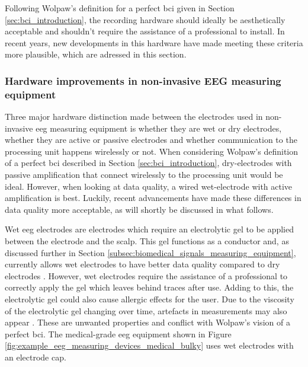 Following Wolpaw's definition for a perfect \gls{bci} given in Section \ref{sec:bci_introduction}, the recording hardware should ideally be aesthetically acceptable and shouldn't require the assistance of a professional to install.
In recent years, new developments in this hardware have made meeting these criteria more plausible, which are adressed in this section.


\subsubsection{Hardware improvements in non-invasive EEG measuring equipment}
\label{subsubsec:bci_gaining_popularity_better_measuring_hardware}

Three major hardware distinction made between the electrodes used in non-invasive \gls{eeg} measuring equipment is whether they are wet or dry electrodes, whether they are active or passive electrodes and whether communication to the processing unit happens wirelessly or not.
When considering Wolpaw's definition of a perfect \gls{bci} described in Section \ref{sec:bci_introduction}, dry-electrodes with passive amplification that connect wirelessly to the processing unit would be ideal.
However, when looking at data quality, a wired wet-electrode with active amplification is best.
Luckily, recent advancements have made these differences in data quality more acceptable, as will shortly be discussed in what follows.

Wet \gls{eeg} electrodes are electrodes which require an electrolytic gel to be applied between the electrode and the scalp.
This gel functions as a conductor and, as discussed further in Section \ref{subsec:biomedical_signals_measuring_equipment}, currently allows wet electrodes to have better data quality compared to dry electrodes \citep{wet_vs_dry, dry_electrode_status, wet_dry_comparison_experiment}.
However, wet electrodes require the assistance of a professional to correctly apply the gel which leaves behind traces after use.
Adding to this, the electrolytic gel could also cause allergic effects for the user. Due to the viscosity of the electrolytic gel changing over time, artefacts in measurements may also appear \citep{dry_electrode_status}.
These are unwanted properties and conflict with Wolpaw's vision of a perfect \gls{bci}.
The medical-grade \gls{eeg} equipment shown in Figure \ref{fig:example_eeg_measuring_devices_medical_bulky} uses wet electrodes with an electrode cap.

